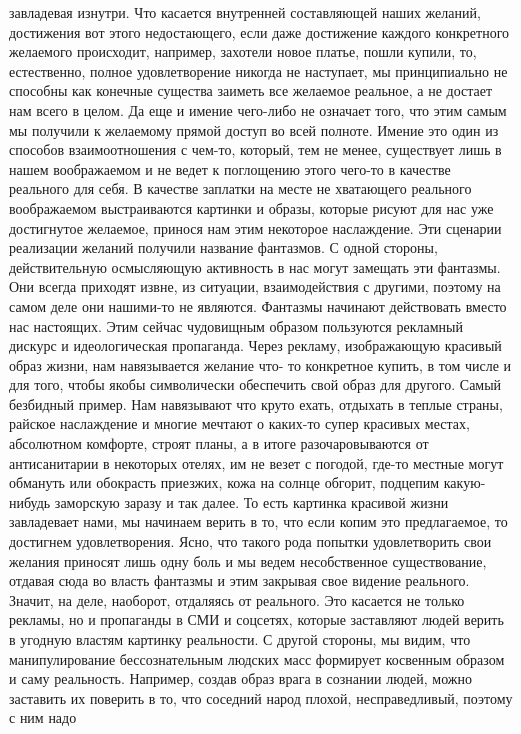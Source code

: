 завладевая изнутри. Что касается внутренней составляющей наших желаний,
достижения вот этого недостающего, если даже достижение каждого конкретного
желаемого происходит, например, захотели новое платье, пошли купили, то,
естественно, полное удовлетворение никогда не наступает, мы принципиально не
способны как конечные существа заиметь все желаемое реальное, а не достает нам
всего в целом. Да еще и имение чего-либо не означает того, что этим самым мы
получили к желаемому прямой доступ во всей полноте. Имение это один из способов
взаимоотношения с чем-то, который, тем не менее, существует лишь в нашем
воображаемом и не ведет к поглощению этого чего-то в качестве реального для
себя. В качестве заплатки на месте не хватающего реального воображаемом
выстраиваются картинки и образы, которые рисуют для нас уже достигнутое
желаемое, принося нам этим некоторое наслаждение. Эти сценарии реализации
желаний получили название фантазмов. С одной стороны, действительную осмысляющую
активность в нас могут замещать эти фантазмы. Они всегда приходят извне, из
ситуации, взаимодействия с другими, поэтому на самом деле они нашими-то не
являются. Фантазмы начинают действовать вместо нас настоящих. Этим сейчас
чудовищным образом пользуются рекламный дискурс и идеологическая пропаганда.
Через рекламу, изображающую красивый образ жизни, нам навязывается желание что-
то конкретное купить, в том числе и для того, чтобы якобы символически
обеспечить свой образ для другого. Самый безбидный пример. Нам навязывают что
круто ехать, отдыхать в теплые страны, райское наслаждение и многие мечтают о
каких-то супер красивых местах, абсолютном комфорте, строят планы, а в итоге
разочаровываются от антисанитарии в некоторых отелях, им не везет с погодой,
где-то местные могут обмануть или обокрасть приезжих, кожа на солнце обгорит,
подцепим какую-нибудь заморскую заразу и так далее. То есть картинка красивой
жизни завладевает нами, мы начинаем верить в то, что если копим это
предлагаемое, то достигнем удовлетворения. Ясно, что такого рода попытки
удовлетворить свои желания приносят лишь одну боль и мы ведем несобственное
существование, отдавая сюда во власть фантазмы и этим закрывая свое видение
реального. Значит, на деле, наоборот, отдаляясь от реального. Это касается не
только рекламы, но и пропаганды в СМИ и соцсетях, которые заставляют людей
верить в угодную властям картинку реальности. С другой стороны, мы видим, что
манипулирование бессознательным людских масс формирует косвенным образом и саму
реальность. Например, создав образ врага в сознании людей, можно заставить их
поверить в то, что соседний народ плохой, несправедливый, поэтому с ним надо

